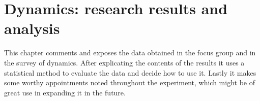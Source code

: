 \chapter{Dynamics: research results and analysis}

This chapter comments and exposes the data obtained in the focus group and in the survey of dynamics. After explicating the contents of the results it uses a statistical method to evaluate the data and decide how to use it. Lastly it makes some worthy appointments noted throughout the experiment, which might be of great use in expanding it in the future.




